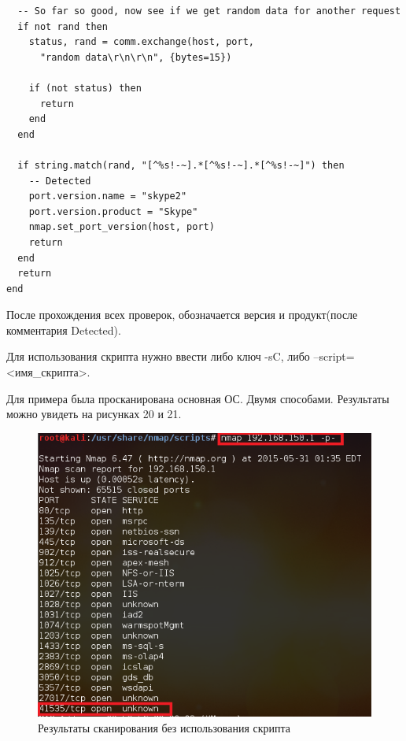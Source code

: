\documentclass[11pt, a4paper]{article}		%
\begin{document}
\begin{itemize}
\begin{verbatim}
  -- So far so good, now see if we get random data for another request
  if not rand then
    status, rand = comm.exchange(host, port,
      "random data\r\n\r\n", {bytes=15})

    if (not status) then
      return
    end
  end

  if string.match(rand, "[^%s!-~].*[^%s!-~].*[^%s!-~]") then
    -- Detected
    port.version.name = "skype2"
    port.version.product = "Skype"
    nmap.set_port_version(host, port)
    return
  end
  return
end
\end{verbatim}

После прохождения всех проверок, обозначается версия и продукт(после комментария Detected).

Для использования скрипта нужно ввести либо ключ -sC, либо --script=<имя\_скрипта>.

Для примера была просканирована основная ОС. Двумя способами. Результаты можно увидеть на рисунках 20 и 21.

\begin{figure}[h!]
\centering
\includegraphics[scale=0.8]{res/script_1}
\caption{Результаты сканирования без использования скрипта}
\end{figure}


\end{itemize}
\end{document}

